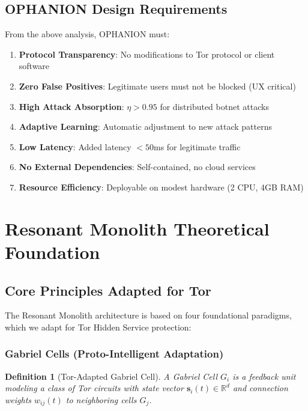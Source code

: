 \documentclass[11pt,a4paper]{article}
\newtheorem{definition}{Definition}[section]
\begin{document}
\subsection{OPHANION Design Requirements}

From the above analysis, OPHANION must:

\begin{enumerate}
\item \textbf{Protocol Transparency}: No modifications to Tor protocol or client software
\item \textbf{Zero False Positives}: Legitimate users must not be blocked (UX critical)
\item \textbf{High Attack Absorption}: $\eta > 0.95$ for distributed botnet attacks
\item \textbf{Adaptive Learning}: Automatic adjustment to new attack patterns
\item \textbf{Low Latency}: Added latency $< 50$ms for legitimate traffic
\item \textbf{No External Dependencies}: Self-contained, no cloud services
\item \textbf{Resource Efficiency}: Deployable on modest hardware (2 CPU, 4GB RAM)
\end{enumerate}

\newpage
\section{Resonant Monolith Theoretical Foundation}

\subsection{Core Principles Adapted for Tor}

The Resonant Monolith architecture is based on four foundational paradigms, which we adapt for Tor Hidden Service protection:

\subsubsection{Gabriel Cells (Proto-Intelligent Adaptation)}

\begin{definition}[Tor-Adapted Gabriel Cell]
A Gabriel Cell $G_i$ is a feedback unit modeling a class of Tor circuits with state vector $\mathbf{s}_i(t) \in \mathbb{R}^d$ and connection weights $w_{ij}(t)$ to neighboring cells $G_j$.
\end{definition}
\end{document}
